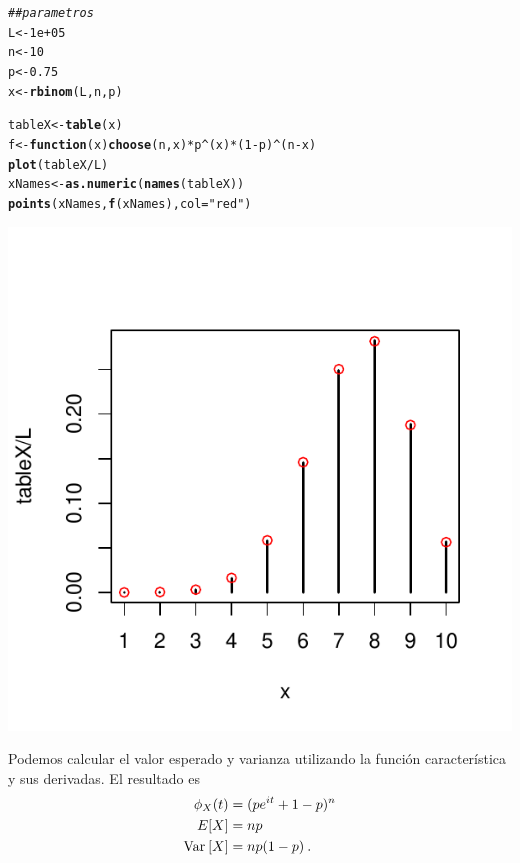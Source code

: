 \documentclass[12pt,reqno]{amsart}\usepackage[]{graphicx}\usepackage[]{color}
\makeatletter
\newcommand{\hlnum}[1]{\textcolor[rgb]{0.686,0.059,0.569}{#1}}%
\newcommand{\hlstr}[1]{\textcolor[rgb]{0.192,0.494,0.8}{#1}}%
\newcommand{\hlcom}[1]{\textcolor[rgb]{0.678,0.584,0.686}{\textit{#1}}}%
\newcommand{\hlopt}[1]{\textcolor[rgb]{0,0,0}{#1}}%
\newcommand{\hlstd}[1]{\textcolor[rgb]{0.345,0.345,0.345}{#1}}%
\newcommand{\hlkwa}[1]{\textcolor[rgb]{0.161,0.373,0.58}{\textbf{#1}}}%
\newcommand{\hlkwb}[1]{\textcolor[rgb]{0.69,0.353,0.396}{#1}}%
\newcommand{\hlkwc}[1]{\textcolor[rgb]{0.333,0.667,0.333}{#1}}%
\newcommand{\hlkwd}[1]{\textcolor[rgb]{0.737,0.353,0.396}{\textbf{#1}}}%
\newenvironment{kframe}{%
 \def\at@end@of@kframe{}%
 \ifinner\ifhmode%
  \def\at@end@of@kframe{\end{minipage}}%
  \begin{minipage}{\columnwidth}%
 \fi\fi%
 \def\FrameCommand##1{\hskip\@totalleftmargin \hskip-\fboxsep
 \colorbox{shadecolor}{##1}\hskip-\fboxsep
     \hskip-\linewidth \hskip-\@totalleftmargin \hskip\columnwidth}%
 \MakeFramed {\advance\hsize-\width
   \@totalleftmargin\z@ \linewidth\hsize
   \@setminipage}}%
 {\par\unskip\endMakeFramed%
 \at@end@of@kframe}
\newenvironment{knitrout}{}{} %
\makeatother
\begin{document}
\begin{knitrout}
\color{fgcolor}\begin{kframe}
\begin{alltt}
\hlcom{## parametros}
\hlstd{L} \hlkwb{<-} \hlnum{1e+05}
\hlstd{n} \hlkwb{<-} \hlnum{10}
\hlstd{p} \hlkwb{<-} \hlnum{0.75}
\hlstd{x} \hlkwb{<-} \hlkwd{rbinom}\hlstd{(L, n, p)}
\end{alltt}
\end{kframe}
\end{knitrout}

\begin{knitrout}
\color{fgcolor}\begin{kframe}
\begin{alltt}
\hlstd{tableX} \hlkwb{<-} \hlkwd{table}\hlstd{(x)}
\hlstd{f} \hlkwb{<-} \hlkwa{function}\hlstd{(}\hlkwc{x}\hlstd{)} \hlkwd{choose}\hlstd{( n , x )} \hlopt{*} \hlstd{p}\hlopt{^}\hlstd{(x)}\hlopt{*}\hlstd{(}\hlnum{1}\hlopt{-}\hlstd{p)}\hlopt{^}\hlstd{(n}\hlopt{-}\hlstd{x)}
\hlkwd{plot}\hlstd{(tableX}\hlopt{/}\hlstd{L)}
\hlstd{xNames} \hlkwb{<-} \hlkwd{as.numeric}\hlstd{(}\hlkwd{names}\hlstd{(tableX))}
\hlkwd{points}\hlstd{( xNames ,} \hlkwd{f}\hlstd{(xNames) ,} \hlkwc{col} \hlstd{=} \hlstr{"red"}\hlstd{)}
\end{alltt}
\end{kframe}
\includegraphics[width=.60\linewidth]{figure/histBinomial_} 

\end{knitrout}


Podemos calcular el valor esperado y varianza utilizando la función característica y sus derivadas. El resultado es
\begin{equation}\label{caracterBinomial}
  \begin{split}
    \phi_{X}(t) &= (p e^{it} + 1 - p )^{n} \\
    E[X] &= np\\
    \mathrm{Var}\: [X] &= np(1-p)\:.
  \end{split}
\end{equation}
\end{document}

